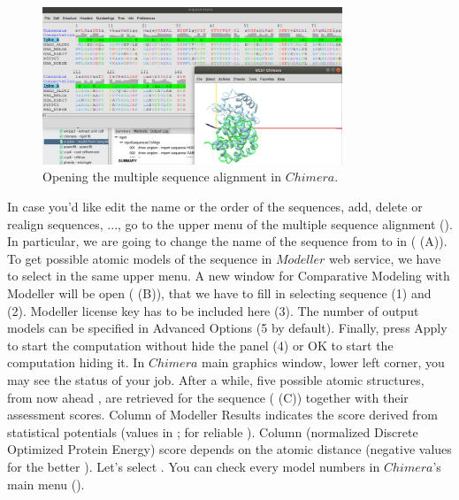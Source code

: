 \begin{itemize}
 \begin{figure}[H]
  \centering 
  \captionsetup{width=.7\linewidth} 
  \includegraphics[width=0.80\textwidth]{Images/Fig14.png}
  \caption{Opening the multiple sequence alignment in $Chimera$.}
  \label{fig:chimera_alignment}
  \end{figure}
\end{itemize}

In case you'd like edit the name or the order of the sequences, add,  delete or realign sequences, ..., go to the upper menu of the multiple sequence alignment (). In particular, we are going to change the name of the  sequence from  to  in  ( (A)). To get possible atomic models of the  sequence in $Modeller$ web service, we have to select  in the same upper menu. A new window for Comparative Modeling with Modeller will be open ( (B)), that we have to fill in selecting  sequence (1) and  (2). Modeller license key has to be included here (3). The number of output models can be specified in Advanced Options (5 by default). Finally, press Apply to start the computation without hide the panel (4) or OK to start the computation hiding it. In $Chimera$ main graphics window, lower left corner, you may see the status of your job. After a while, five possible atomic structures, from now ahead , are retrieved for the  sequence ( (C)) together with their assessment scores. Column  of Modeller Results indicates the score derived from statistical potentials (values in \ttt{[0,1]};  for reliable ). Column  (normalized Discrete Optimized Protein Energy) score depends on the atomic distance (negative values for the better ). Let's select  . You can check every model numbers in $Chimera$'s main menu ().
 
